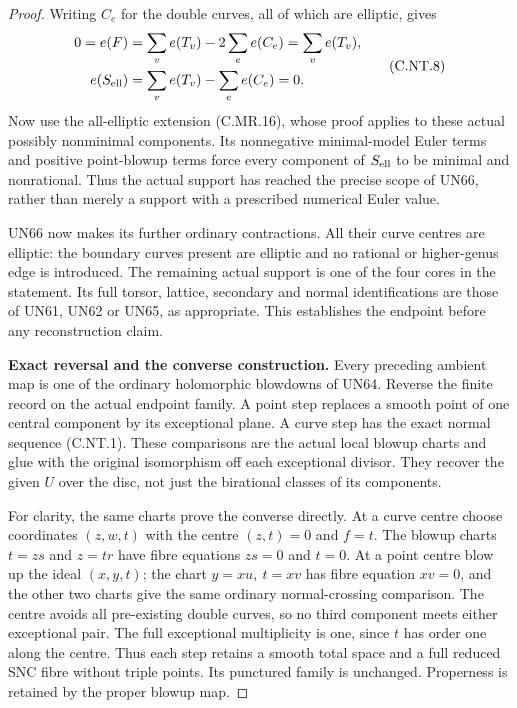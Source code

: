 \begin{proof}
Writing $C_e$ for the double curves, all of which
are elliptic, gives
\[
 \begin{split}
 0=e(F)&=\sum_v e(T_v)-2\sum_e e(C_e)
                            =\sum_v e(T_v),\\
 e(S_{\rm ell})&=\sum_v e(T_v)-\sum_e e(C_e)=0.
 \end{split}
\tag{C.NT.8}
\]
Now use the all-elliptic extension (C.MR.16), whose
proof applies to these actual possibly nonminimal
components. Its nonnegative minimal-model Euler
terms and positive point-blowup terms force every
component of $S_{\rm ell}$ to be minimal and
nonrational. Thus the actual support has reached
the precise scope of UN66, rather than merely a
support with a prescribed numerical Euler value.

UN66 now makes its further ordinary contractions.
All their curve centres are elliptic: the boundary
curves present are elliptic and no rational or
higher-genus edge is introduced. The remaining
actual support is one of the four cores in the
statement. Its full torsor, lattice, secondary and
normal identifications are those of UN61, UN62
or UN65, as appropriate. This establishes the
endpoint before any reconstruction claim.

\par\medskip\noindent\textbf{Exact reversal and the converse construction.}
Every preceding ambient map is one of the ordinary
holomorphic blowdowns of UN64. Reverse the finite
record on the actual endpoint family. A point
step replaces a smooth point of one central
component by its exceptional plane. A curve
step has the exact normal sequence (C.NT.1).
These comparisons are the actual local blowup
charts and glue with the original isomorphism
off each exceptional divisor. They recover the
given $U$ over the disc, not just the birational
classes of its components.

For clarity, the same charts prove the converse
directly. At a curve centre choose coordinates
$(z,w,t)$ with the centre $(z,t)=0$ and $f=t$.
The blowup charts $t=zs$ and $z=tr$ have fibre
equations $zs=0$ and $t=0$. At a point centre
blow up the ideal $(x,y,t)$; the chart
$y=xu,\ t=xv$ has fibre equation $xv=0$,
and the other two charts give the same ordinary
normal-crossing comparison. The centre avoids
all pre-existing double curves, so no third
component meets either exceptional pair.
The full exceptional multiplicity is one, since
$t$ has order one along the centre.
Thus each step retains a smooth total space
and a full reduced SNC fibre without triple points.
Its punctured family is unchanged. Properness
is retained by the proper blowup map.


\end{proof}
